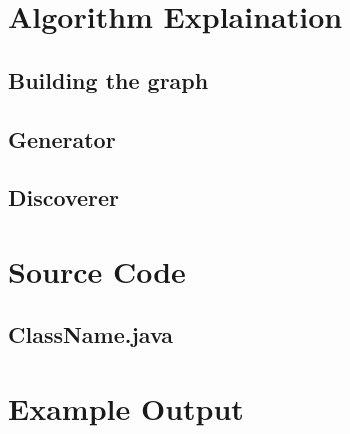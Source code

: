 \documentclass[12pt, titlepage, a4paper, twoside]{article}
\begin{document}
\section*{Algorithm Explaination}

\subsection*{Building the graph}

\subsection*{Generator}

\subsection*{Discoverer}

\newpage
\section*{Source Code}

\subsection*{ClassName.java}

\newpage

\section*{Example Output}

\end{document}
